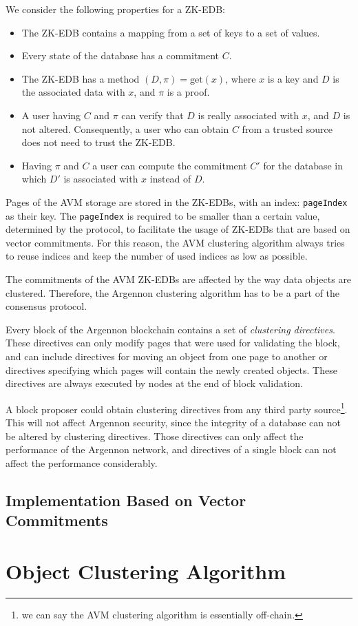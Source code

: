 We consider the following properties for a ZK-EDB:
\begin{itemize}
    \item The ZK-EDB contains a mapping from a set of keys to a set of values.
    \item Every state of the database has a commitment \(C\).
    \item The ZK-EDB has a method \((D, \pi) = \text{get}(x)\), where \(x\) is a key and \(D\) is the associated data
    with \(x\), and \(\pi\) is a proof.
    \item A user having \(C\) and \(\pi\) can verify that \(D\) is really associated with \(x\), and \(D\) is not
    altered. Consequently, a user who can obtain \(C\) from a trusted source does not need to trust the ZK-EDB\@.
    \item Having \(\pi\) and \(C\) a user can compute the commitment \(C'\) for the database in which \(D'\) is
    associated with \(x\) instead of \(D\).
\end{itemize}

Pages of the AVM storage are stored in the ZK-EDBs, with an index: \texttt{pageIndex} as their key.
The \texttt{pageIndex} is required to be smaller than a certain value, determined by the
protocol, to facilitate the usage of ZK-EDBs that are based on vector commitments.
For this reason, the AVM clustering algorithm always tries to reuse indices and keep the number of used indices
as low as possible.

The commitments of the AVM ZK-EDBs are affected by the way data objects are clustered. Therefore,
the Argennon clustering algorithm has to be a part of the consensus protocol.

Every block of the Argennon blockchain contains a set of \emph{clustering directives}. These directives
can only modify pages that were used for validating the block, and can
include directives for moving an object from one page to another or directives specifying which pages will contain
the newly created objects. These directives are always executed by nodes at the end of block validation.

A block proposer could obtain clustering directives from any third party source\footnote{we can say the AVM clustering
algorithm is essentially off-chain.}. This will not
affect Argennon security, since the integrity of a database can not be altered by clustering directives.
Those directives can only affect the performance of the Argennon network, and directives of a single block can
not affect the performance considerably.

\subsection[Implementation]{Implementation Based on Vector Commitments}\label{subsec:impl-zk-edbs}


\section{Object Clustering Algorithm}\label{sec:clustering}



